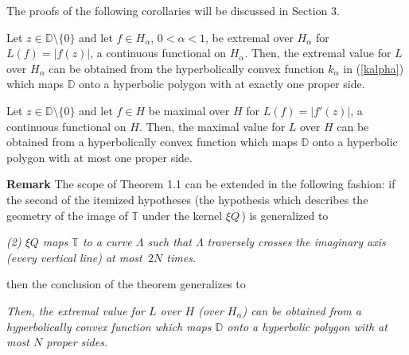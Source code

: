 \documentclass[final]{siamltex}
\newcommand{\dsp}{\displaystyle}
\newcommand{\T}{\mathbb{T}}
\newcommand{\D}{\mathbb{D}}
\begin{document}
\vspace{0.1in}

The proofs of the following corollaries will be discussed in Section 3.

\vspace{0.1in}

\begin{corollary}\label{cor1}
Let $z \in \D \setminus \{0\}$ and let $f \in H_{\alpha}$, $0 < \alpha < 1$, be extremal over $H_{\alpha}$ for ${\dsp L(f) = |{f(z)}|}$, a continuous functional on $H_{\alpha}$.  Then, the extremal value for $L$ over $H_{\alpha}$ can be obtained from the hyperbolically convex function $k_{\alpha}$ in (\ref{kalpha}) which maps $\D$ onto a hyperbolic polygon with at exactly one proper side.
\end{corollary}

\newpage

\begin{corollary}\label{cor2}
Let $z \in \D \setminus \{0\}$ and let $f \in H$ be maximal over $H$ for ${\dsp L(f) = |{f'(z)}|}$, a continuous functional on $H$.  Then, the maximal value for $L$ over $H$ can be obtained from a hyperbolically convex function which maps $\D$ onto a hyperbolic polygon with at most one proper side.
\end{corollary}

\vspace{0.1in} 

\noindent \textbf{Remark} The scope of Theorem 1.1 can be extended in the following fashion:  if the second of the itemized hypotheses (the hypothesis which describes the geometry of the image of $\T$ under the kernel $\xi Q\,$) is generalized to 

\vspace{0.1in} 

{\em
(2) $\xi Q$ maps $\T$ to a curve $\Lambda$ such that $\Lambda$ traversely crosses the imaginary axis (every vertical line) at most $\,2N$ times.
}
\vspace{0.1in} 

\noindent then the conclusion of the theorem generalizes to

\vspace{0.1in} 

{\em
Then, the extremal value for $L$ over $H$ (over $H_{\alpha}$) can be obtained from a hyperbolically convex function which maps $\D$ onto a hyperbolic polygon with at most $N$ proper sides.
}
\vspace{0.1in} 
\end{document}
